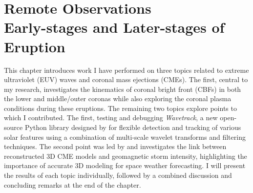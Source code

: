 \chapter[Remote Observations: Early-stages and Later-stages of Eruption]{Remote Observations\\\LARGE Early-stages and Later-stages of Eruption}
\label{chapter2}
This chapter introduces work I have performed on three topics related to extreme ultraviolet (EUV) waves and coronal mass ejections (CMEs). The first, central to my research, investigates the kinematics of coronal bright front (CBFs) in both the lower and middle/outer coronas while also exploring the coronal plasma conditions during these eruptions.
The remaining two topics explore points to which I contributed. The first, testing and debugging \textit{Wavetrack}, a new open-source Python library designed by \citet{stepanyuk_2022} for flexible detection and tracking of various solar features using a combination of multi-scale wavelet transforms and filtering techniques. The second point was led by \citet{miteva_2023} and investigates the link between reconstructed 3D CME models and geomagnetic storm intensity, highlighting the importance of accurate 3D modeling for space weather forecasting.
I will present the results of each topic individually, followed by a combined discussion and concluding remarks at the end of the chapter.


